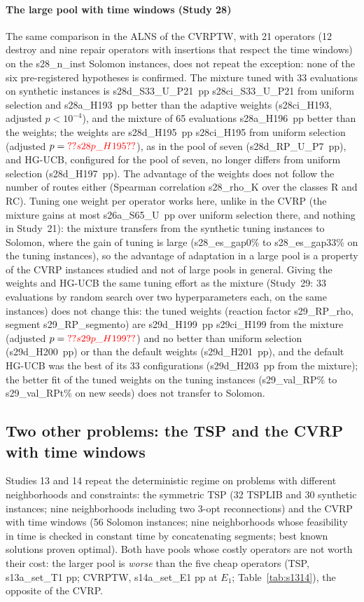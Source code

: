 \paragraph{The large pool with time windows (Study 28)} The same comparison in the ALNS of the CVRPTW, with 21 operators (12 destroy and nine repair operators with insertions that respect the time windows) on the \num{s28_n_inst} Solomon instances, does not repeat the exception: none of the six pre-registered hypotheses is confirmed. The mixture tuned with 33 evaluations on synthetic instances is \num{s28d_S33_U_P21}~pp \num{s28ci_S33_U_P21} from uniform selection and \num{s28a_H193}~pp better than the adaptive weights (\num{s28ci_H193}, adjusted $p<10^{-4}$), and the mixture of 65 evaluations \num{s28a_H196}~pp better than the weights; the weights are \num{s28d_H195}~pp \num{s28ci_H195} from uniform selection (adjusted $p=\num{s28p_H195}$), as in the pool of seven (\num{s28d_RP_U_P7}~pp), and HG-UCB, configured for the pool of seven, no longer differs from uniform selection (\num{s28d_H197}~pp). The advantage of the weights does not follow the number of routes either (Spearman correlation \num{s28_rho_K} over the classes R and RC). Tuning one weight per operator works here, unlike in the CVRP (the mixture gains at most \num{s26a_S65_U}~pp over uniform selection there, and nothing in Study~21): the mixture transfers from the synthetic tuning instances to Solomon, where the gain of tuning is large (\num{s28_es_gap0}\% to \num{s28_es_gap33}\% on the tuning instances), so the advantage of adaptation in a large pool is a property of the CVRP instances studied and not of large pools in general. Giving the weights and HG-UCB the same tuning effort as the mixture (Study~29: 33 evaluations by random search over two hyperparameters each, on the same instances) does not change this: the tuned weights (reaction factor \num{s29_RP_rho}, segment \num{s29_RP_segmento}) are \num{s29d_H199}~pp \num{s29ci_H199} from the mixture (adjusted $p=\num{s29p_H199}$) and no better than uniform selection (\num{s29d_H200}~pp) or than the default weights (\num{s29d_H201}~pp), and the default HG-UCB was the best of its 33 configurations (\num{s29d_H203}~pp from the mixture); the better fit of the tuned weights on the tuning instances (\num{s29_val_RP}\% to \num{s29_val_RPt}\% on new seeds) does not transfer to Solomon.

\subsection{Two other problems: the TSP and the CVRP with time windows}\label{sec:r6}
Studies 13 and 14 repeat the deterministic regime on problems with different neighborhoods and constraints: the symmetric TSP (32 TSPLIB and 30 synthetic instances; nine neighborhoods including two 3-opt reconnections) and the CVRP with time windows (56 Solomon instances; nine neighborhoods whose feasibility in time is checked in constant time by concatenating segments; best known solutions proven optimal). Both have pools whose costly operators are not worth their cost: the larger pool is \emph{worse} than the five cheap operators (TSP, \num{s13a_set_T1} pp; CVRPTW, \num{s14a_set_E1} pp at $E_1$; Table~\ref{tab:s1314}), the opposite of the CVRP.

